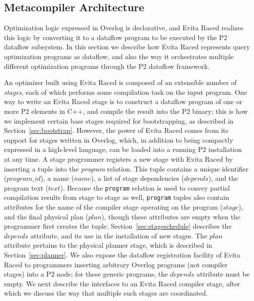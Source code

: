 \documentclass{sigmod08}
\newcommand{\ol}[1]{\texttt{\small #1}\xspace}
\begin{document}
\subsection{Metacompiler Architecture}
\label{sec:metaarch}
Optimization logic expressed in Overlog is declarative, and Evita Raced realizes this logic by converting it to a dataflow program to be executed by the P2 dataflow subsystem.  In this section we describe how Evita Raced represents query optimization programs as dataflow, and also the way it orchestrates multiple different optimization programs through the P2 dataflow framework.

An optimizer built using Evita Raced is composed of an extensible number of {\em stages}, each of which performs some
compilation task on the input program. One way to write an Evita Raced stage is to construct a dataflow program of one or more P2 elements in C++, and compile the result into the P2 binary; this is how we implement certain base stages required for bootstrapping, as described in Section~\ref{sec:bootstrap}.  However, the power of Evita Raced comes from its support for stages written in Overlog, which, in addition to being compactly expressed in a high-level language, can be loaded into a running P2 installation at any time. 
A stage programmer registers a new stage with Evita Raced by inserting a tuple into the {\em program} relation. 
This tuple contains a unique identifier ($program\_id$), a name
($name$),  a list of stage dependencies ($depends$), and the program
text ($text$). Because the \ol{program} relation is used to convey
partial compilation results from stage to stage as well, \ol{program}
tuples also contain attributes for the name of the compiler stage operating 
on the program ($stage$), and the final physical plan ($plan$), though
these attributes are empty when the programmer first creates the tuple. Section~\ref{sec:stageschedule} describes the
$depends$ attribute, and its use in the installation of new stages. The $plan$ attribute pertains to the
physical planner stage, which is described in Section~\ref{sec:planner}.
We also expose the dataflow registration facility of Evita Raced to programmers inserting arbitrary
Overlog programs  (not compiler stages) into a P2 node; for these generic programs, the $depends$ attribute must be empty.  We next describe the 
interfaces to an Evita Raced compiler stage, after which we discuss the way that multiple such stages are coordinated.
\end{document}
